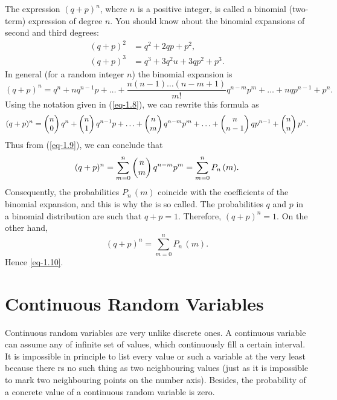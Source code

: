  The expression $(q + p)^{n}$, where $n$ is a positive integer, is called a binomial (two-term) expression of degree $n$. You should know about the binomial expansions of second and third degrees:
\begin{align*}
(q + p)^{2} & = q^{2}+ 2qp + p^{2}, \\
(q + p)^{3} & = q^{3} + 3q^{2}u + 3qp^{2} + p^{3}.
\end{align*}
In general (for a random integer $n$) the binomial expansion is
\begin{equation*}
(q+p)^{n} = q^{n} + nq^{n-1}p + \ldots + \frac{n(n-1) \ldots (n-m+1)}{m!} q^{n-m} p^{m} +
\ldots + nqp^{n-1} + p^{n}.
\end{equation*}
Using the notation given in (\ref{eq-1.8}), we can rewrite this formula as
\begin{equation*}
(q + p)^{n} = \mqty(n \\ 0) \, q^{n}
+  \mqty(n \\ 1)\, q^{n-1}p + \ldots
 +  \mqty(n \\ m) \, q^{n-m}p^{m} + \ldots
+  \mqty(n \\ n-1) \, qp^{n-1} +  \mqty(n \\ n) \, p^{n}.
\end{equation*}
Thus from (\ref{eq-1.9}), we can conclude that
\begin{equation*}
(q + p)^{n} = \sum_{m=0}^{n}  \mqty(n \\ m) \,  q^{n-m}p^{m} = \sum_{m=0}^{n}   P_{n}\,(m).
\end{equation*}
Consequently, the probabilities $P_{n}\, (m)$ coincide with the coefficients of
the binomial expansion, and this is why the  is so
called. The probabilities $q$ and $p$ in a binomial distribution are such that $q + p = 1$. Therefore, $(q + p)^{n} = 1$. On the other hand,
\begin{equation*}
(q+p)^{n} =  \sum_{m=0}^{n}   P_{n}\,(m).
\end{equation*}
Hence \eqref{eq-1.10}.

\section{Continuous Random Variables}

Continuous random variables are very unlike discrete ones.
A continuous variable can assume any of inﬁnite set of values, which
continuously fill a certain interval. It is impossible in principle to list
every value or such a variable at the very least because there rs no such
thing as two neighbouring values (just as it is impossible to mark two
neighbouring points on the number axis). Besides, the probability of
a concrete value of a continuous random variable is zero.

